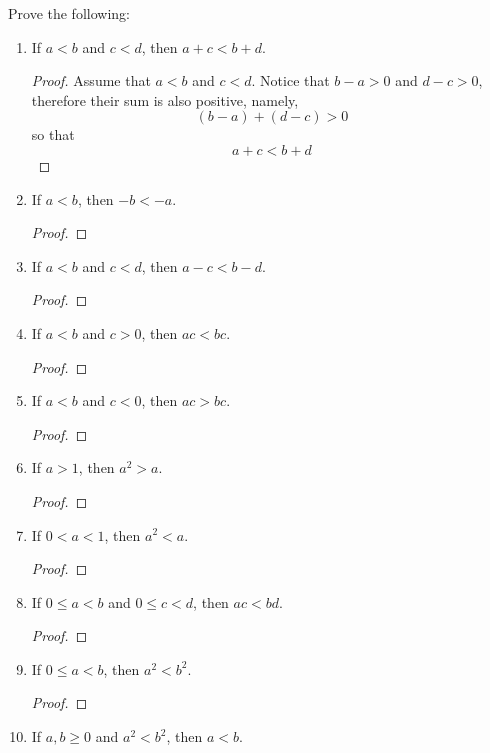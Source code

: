 \begin{exercise}[\textbf{5}] Prove the following:
     \begin{enumerate}
         \item If $a<b$ and $c<d$, then $a+c<b+d$.
         \begin{proof} Assume that $a<b$ and $c<d$. Notice that $b-a>0$ and
         $d-c>0$, therefore their sum is also positive, namely,
              \begin{equation*}
                  (b-a)+(d-c)>0
              \end{equation*}
            so that 
            \begin{equation*}
                a+c < b+d
            \end{equation*}
         \end{proof}
         \item If $a<b$, then $-b<-a$.
         \begin{proof}
              
         \end{proof}
         \item If $a<b$ and $c<d$, then $a-c<b-d$.
         \begin{proof}
              
         \end{proof}
         \item If $a<b$ and $c>0$, then $ac<bc$.
         \begin{proof}
              
         \end{proof}
         \item If $a<b$ and $c<0$, then $ac>bc$.
         \begin{proof}
              
         \end{proof}
         \item If $a>1$, then $a^2>a$.
         \begin{proof}
              
         \end{proof}
         \item If $0<a<1$, then $a^2<a$.
         \begin{proof}
              
         \end{proof}
         \item If $0\leq a<b$ and $0\leq c<d$, then $ac<bd$.
         \begin{proof}
              
         \end{proof}
         \item If $0 \leq a<b$, then $a^2<b^2$.
         \begin{proof}
              
         \end{proof}
         \item If $a,b \geq 0$ and $a^2<b^2$, then $a<b$.
     \end{enumerate}
\end{exercise}